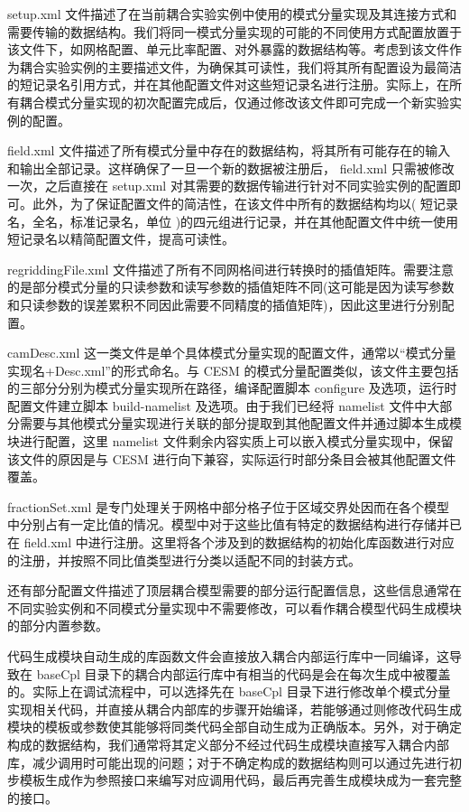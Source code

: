 setup.xml 文件描述了在当前耦合实验实例中使用的模式分量实现及其连接方式和需要传输的数据结构。我们将同一模式分量实现的可能的不同使用方式配置放置于该文件下，如网格配置、单元比率配置、对外暴露的数据结构等。考虑到该文件作为耦合实验实例的主要描述文件，为确保其可读性，我们将其所有配置设为最简洁的短记录名引用方式，并在其他配置文件对这些短记录名进行注册。实际上，在所有耦合模式分量实现的初次配置完成后，仅通过修改该文件即可完成一个新实验实例的配置。

field.xml 文件描述了所有模式分量中存在的数据结构，将其所有可能存在的输入和输出全部记录。这样确保了一旦一个新的数据被注册后， field.xml 只需被修改一次，之后直接在 setup.xml 对其需要的数据传输进行针对不同实验实例的配置即可。此外，为了保证配置文件的简洁性，在该文件中所有的数据结构均以( 短记录名，全名，标准记录名，单位 )的四元组进行记录，并在其他配置文件中统一使用短记录名以精简配置文件，提高可读性。

regriddingFile.xml 文件描述了所有不同网格间进行转换时的插值矩阵。需要注意的是部分模式分量的只读参数和读写参数的插值矩阵不同(这可能是因为读写参数和只读参数的误差累积不同因此需要不同精度的插值矩阵)，因此这里进行分别配置。

camDesc.xml 这一类文件是单个具体模式分量实现的配置文件，通常以“模式分量实现名+Desc.xml”的形式命名。与 CESM 的模式分量配置类似，该文件主要包括的三部分分别为模式分量实现所在路径，编译配置脚本 configure 及选项，运行时配置文件建立脚本 build-namelist 及选项。由于我们已经将 namelist 文件中大部分需要与其他模式分量实现进行关联的部分提取到其他配置文件并通过脚本生成模块进行配置，这里 namelist 文件剩余内容实质上可以嵌入模式分量实现中，保留该文件的原因是与 CESM 进行向下兼容，实际运行时部分条目会被其他配置文件覆盖。

fractionSet.xml 是专门处理关于网格中部分格子位于区域交界处因而在各个模型中分别占有一定比值的情况。模型中对于这些比值有特定的数据结构进行存储并已在 field.xml 中进行注册。这里将各个涉及到的数据结构的初始化库函数进行对应的注册，并按照不同比值类型进行分类以适配不同的封装方式。

还有部分配置文件描述了顶层耦合模型需要的部分运行配置信息，这些信息通常在不同实验实例和不同模式分量实现中不需要修改，可以看作耦合模型代码生成模块的部分内置参数。

代码生成模块自动生成的库函数文件会直接放入耦合内部运行库中一同编译，这导致在 baseCpl 目录下的耦合内部运行库中有相当的代码是会在每次生成中被覆盖的。实际上在调试流程中，可以选择先在 baseCpl 目录下进行修改单个模式分量实现相关代码，并直接从耦合内部库的步骤开始编译，若能够通过则修改代码生成模块的模板或参数使其能够将同类代码全部自动生成为正确版本。另外，对于确定构成的数据结构，我们通常将其定义部分不经过代码生成模块直接写入耦合内部库，减少调用时可能出现的问题；对于不确定构成的数据结构则可以通过先进行初步模板生成作为参照接口来编写对应调用代码，最后再完善生成模块成为一套完整的接口。

